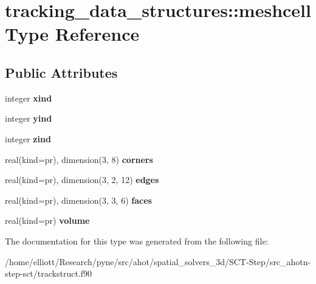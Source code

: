 \hypertarget{structtracking__data__structures_1_1meshcell}{\section{tracking\-\_\-data\-\_\-structures\-:\-:meshcell Type Reference}
\label{structtracking__data__structures_1_1meshcell}
}
\subsection*{Public Attributes}
\begin{DoxyCompactItemize}
\item 
\hypertarget{structtracking__data__structures_1_1meshcell_afd4a41c0924cdfa672043dff98383247}{integer {\bfseries xind}}\label{structtracking__data__structures_1_1meshcell_afd4a41c0924cdfa672043dff98383247}

\item 
\hypertarget{structtracking__data__structures_1_1meshcell_aaf221593bf60310472dfdcc78d6c2e79}{integer {\bfseries yind}}\label{structtracking__data__structures_1_1meshcell_aaf221593bf60310472dfdcc78d6c2e79}

\item 
\hypertarget{structtracking__data__structures_1_1meshcell_ae19a4af32e3f12bfa8042da05505aa6e}{integer {\bfseries zind}}\label{structtracking__data__structures_1_1meshcell_ae19a4af32e3f12bfa8042da05505aa6e}

\item 
\hypertarget{structtracking__data__structures_1_1meshcell_a13fcf4021ce5a5d1579ffbff38aaf33d}{real(kind=pr), dimension(3, 8) {\bfseries corners}}\label{structtracking__data__structures_1_1meshcell_a13fcf4021ce5a5d1579ffbff38aaf33d}

\item 
\hypertarget{structtracking__data__structures_1_1meshcell_a4edd8593d1bb0badbc5d723780d2c6c5}{real(kind=pr), dimension(3, 2, 12) {\bfseries edges}}\label{structtracking__data__structures_1_1meshcell_a4edd8593d1bb0badbc5d723780d2c6c5}

\item 
\hypertarget{structtracking__data__structures_1_1meshcell_a8b0a596007ab35b13961d9037d7b6e44}{real(kind=pr), dimension(3, 3, 6) {\bfseries faces}}\label{structtracking__data__structures_1_1meshcell_a8b0a596007ab35b13961d9037d7b6e44}

\item 
\hypertarget{structtracking__data__structures_1_1meshcell_a1a08090e934eae80b9b27f55c4ccaa00}{real(kind=pr) {\bfseries volume}}\label{structtracking__data__structures_1_1meshcell_a1a08090e934eae80b9b27f55c4ccaa00}

\end{DoxyCompactItemize}


The documentation for this type was generated from the following file\-:\begin{DoxyCompactItemize}
\item 
/home/elliott/\-Research/pyne/src/ahot/spatial\-\_\-solvers\-\_\-3d/\-S\-C\-T-\/\-Step/src\-\_\-ahotn-\/step-\/sct/trackstruct.\-f90\end{DoxyCompactItemize}
